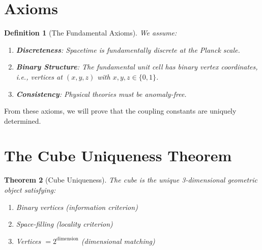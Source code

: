 \documentclass[twocolumn,showpacs,preprintnumbers,amsmath,amssymb,prd]{revtex4-2}
\newtheorem{theorem}{Theorem}[section]
\newtheorem{definition}[theorem]{Definition}
\begin{document}
\section{Axioms}

\begin{definition}[The Fundamental Axioms]
We assume:
\begin{enumerate}
\item[\textbf{A1.}] \textbf{Discreteness}: Spacetime is fundamentally discrete at the Planck scale.
\item[\textbf{A2.}] \textbf{Binary Structure}: The fundamental unit cell has binary vertex coordinates, i.e., vertices at $(x,y,z)$ with $x,y,z \in \{0,1\}$.
\item[\textbf{A3.}] \textbf{Consistency}: Physical theories must be anomaly-free.
\end{enumerate}
\end{definition}

From these axioms, we will prove that the coupling constants are uniquely determined.

\section{The Cube Uniqueness Theorem}

\begin{theorem}[Cube Uniqueness]
\label{thm:cube}
The cube is the unique 3-dimensional geometric object satisfying:
\begin{enumerate}
\item Binary vertices (information criterion)
\item Space-filling (locality criterion)
\item Vertices $= 2^{\text{dimension}}$ (dimensional matching)
\end{enumerate}
\end{theorem}
\end{document}

